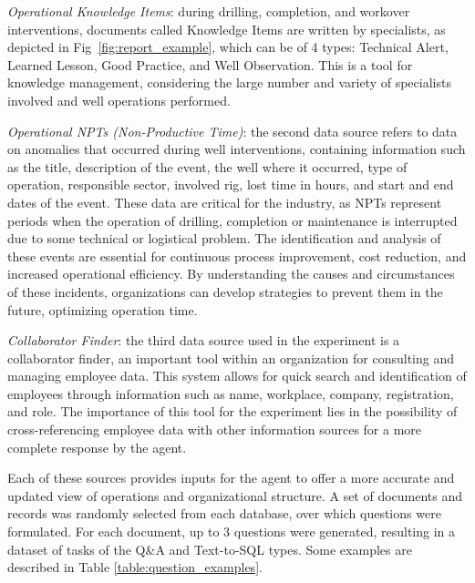             \emph{Operational Knowledge Items}: during drilling, completion, and workover interventions, documents called Knowledge Items are written by specialists, as depicted in Fig~\ref{fig:report_example}, which can be of 4 types: Technical Alert, Learned Lesson, Good Practice, and Well Observation. 
            This is a tool for knowledge management, considering the large number and variety of specialists involved and well operations performed.
            
            \emph{Operational NPTs (Non-Productive Time)}: the second data source refers to data on anomalies that occurred during well interventions, containing information such as the title, description of the event, the well where it occurred, type of operation, responsible sector, involved rig, lost time in hours, and start and end dates of the event. 
            These data are critical for the industry, as NPTs represent periods when the operation of drilling, completion or maintenance is interrupted due to some technical or logistical problem. The identification and analysis of these events are essential for continuous process improvement, cost reduction, and increased operational efficiency. By understanding the causes and circumstances of these incidents, organizations can develop strategies to prevent them in the future, optimizing operation time.
            
            \emph{Collaborator Finder}: the third data source used in the experiment is a collaborator finder, an important tool within an organization for consulting and managing employee data. 
            This system allows for quick search and identification of employees through information such as name, workplace, company, registration, and role. The importance of this tool for the experiment lies in the possibility of cross-referencing employee data with other information sources for a more complete response by the agent.
            
            Each of these sources provides inputs for the agent to offer a more accurate and updated view of operations and organizational structure.
            A set of documents and records was randomly selected from each database, over which questions were formulated. For each document, up to 3 questions were generated, resulting in a dataset of tasks of the Q\&A and Text-to-SQL types. Some examples are described in Table \ref{table:question_examples}.

